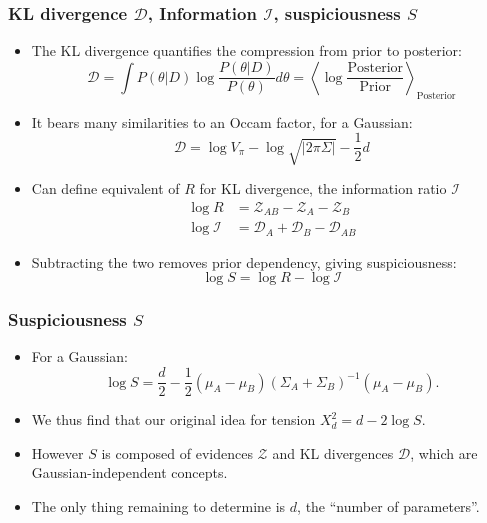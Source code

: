 \documentclass[%
]{beamer}
\begin{document}
\begin{frame}
    \frametitle{KL divergence $\mathcal{D}$, Information $\mathcal{I}$, suspiciousness $S$}
    \begin{itemize}
        \item The KL divergence quantifies the compression from prior to posterior:
            \[
                \mathcal{D} = \int P(\theta|D) \log \frac{P(\theta|D)}{P(\theta)} d\theta = \left\langle\log\frac{\text{Posterior}}{\text{Prior}}\right\rangle_\text{Posterior}
            \]
        \item It bears many similarities to an Occam factor, for a Gaussian:
            \[
                \mathcal{D} =   \log V_\pi - \log \sqrt{|2\pi\Sigma|} - \frac{1}{2}d
            \]
        \item Can define equivalent of $R$ for KL divergence, the information ratio $\mathcal{I}$
            \begin{align}
                \log R &= \mathcal{Z}_{AB} -\mathcal{Z}_A - \mathcal{Z}_B \nonumber\\
                \log \mathcal{I} &= \mathcal{D}_A + \mathcal{D}_B - \mathcal{D}_{AB} \nonumber
            \end{align}
        \item Subtracting the two removes prior dependency, giving suspiciousness:
            \[
                \log S = \log R - \log \mathcal{I}
            \]
    \end{itemize}

\end{frame}

\begin{frame}
    \frametitle{Suspiciousness $S$}
    \begin{itemize}
        \item For a Gaussian:
            \[
                \log S = \frac{d}{2}  -\frac{1}{2} (\mu_A-\mu_B){(\Sigma_{A}+\Sigma_{B})}^{-1}(\mu_A-\mu_B).
            \]
        \item We thus find that our original idea for tension $X^2_d=d-2\log S$.
        \item However $S$ is composed of evidences $\mathcal{Z}$ and KL divergences $\mathcal{D}$, which are Gaussian-independent concepts.
        \item The only thing remaining to determine is $d$, the ``number of parameters''.
    \end{itemize}

\end{frame}
\end{document}
